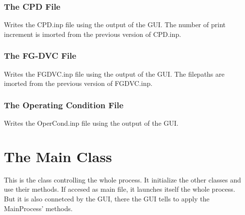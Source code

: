 \documentclass[letterpaper,10pt,english]{sphinxmanual}
\begin{document}
\subsection{The CPD File}
\label{GUI:the-cpd-file}

\begin{fulllineitems}
\label{GUI:writeInfoFiles.WriteCPDFile}
Writes the CPD.inp file using the output of the GUI. The number of print increment is imorted from the previous version of CPD.inp.

\end{fulllineitems}



\subsection{The FG-DVC File}
\label{GUI:the-fg-dvc-file}

\begin{fulllineitems}
\label{GUI:writeInfoFiles.WriteFGFile}
Writes the FGDVC.inp file using the output of the GUI. The filepaths are imorted from the previous version of FGDVC.inp.

\end{fulllineitems}



\subsection{The Operating Condition File}
\label{GUI:the-operating-condition-file}

\begin{fulllineitems}
\label{GUI:writeInfoFiles.WriteOCFile}
Writes the OperCond.inp file using the output of the GUI.

\end{fulllineitems}



\chapter{The Main Class}
\label{MainProgramCode:the-main-class}\label{MainProgramCode::doc}
This is the class controlling the whole process. It initialize the other classes and use their methods. If accesed as main file, it launches itself the whole process. But it is also connetced by the GUI, there the GUI tells to apply the MainProcess' methods.
\end{document}
